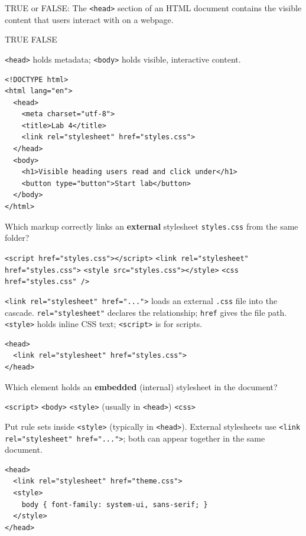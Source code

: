 \newpage


\question[4]
TRUE or FALSE: The \texttt{<head>} section of an HTML document contains the visible content that users interact with on a webpage.
\begin{choices}
  \choice TRUE
  \CorrectChoice FALSE
\end{choices}
\begin{solution}
  \texttt{<head>} holds metadata; \texttt{<body>} holds visible, interactive content.
\begin{lstlisting}[style=htmlinline]
<!DOCTYPE html>
<html lang="en">
  <head>
    <meta charset="utf-8">
    <title>Lab 4</title>
    <link rel="stylesheet" href="styles.css">
  </head>
  <body>
    <h1>Visible heading users read and click under</h1>
    <button type="button">Start lab</button>
  </body>
</html>
\end{lstlisting}
\end{solution}

\question[4]
Which markup correctly links an \textbf{external} stylesheet \texttt{styles.css} from the same folder?
\begin{choices}
  \choice \texttt{<script href="styles.css"></script>}
  \CorrectChoice \texttt{<link rel="stylesheet" href="styles.css">}
  \choice \texttt{<style src="styles.css"></style>}
  \choice \texttt{<css href="styles.css" />}
\end{choices}
\begin{solution}
  \texttt{<link rel="stylesheet" href="...">} loads an external \texttt{.css} file into the cascade. \texttt{rel="stylesheet"} declares the relationship; \texttt{href} gives the file path. \texttt{<style>} holds inline CSS text; \texttt{<script>} is for scripts.
\begin{lstlisting}[style=htmlinline]
<head>
  <link rel="stylesheet" href="styles.css">
</head>
\end{lstlisting}
\end{solution}

\newpage

\question[4]
Which element holds an \textbf{embedded} (internal) stylesheet in the document?
\begin{choices}
  \choice \texttt{<script>}
  \choice \texttt{<body>}
  \CorrectChoice \texttt{<style>} (usually in \texttt{<head>})
  \choice \texttt{<css>}
\end{choices}
\begin{solution}
  Put rule sets inside \texttt{<style>} (typically in \texttt{<head>}). External stylesheets use \texttt{<link rel="stylesheet" href="...">}; both can appear together in the same document.
\begin{lstlisting}[style=htmlinline]
<head>
  <link rel="stylesheet" href="theme.css">
  <style>
    body { font-family: system-ui, sans-serif; }
  </style>
</head>
\end{lstlisting}
\end{solution}

